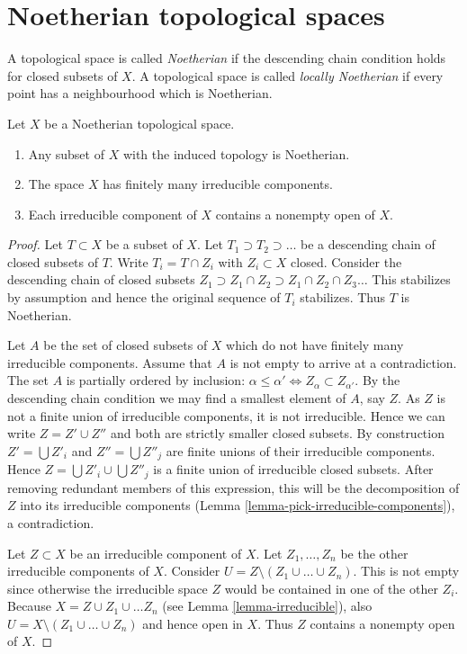 \section{Noetherian topological spaces}
\label{section-noetherian}

\begin{definition}
\label{definition-noetherian}
A topological space is called {\it Noetherian}
if the descending chain condition holds for
closed subsets of $X$. A topological space is called
{\it locally Noetherian} if every point has a neighbourhood
which is Noetherian.
\end{definition}

\begin{lemma}
\label{lemma-Noetherian}
Let $X$ be a Noetherian topological space.
\begin{enumerate}
\item Any subset of $X$ with the induced topology is Noetherian.
\item The space $X$ has finitely many irreducible components.
\item Each irreducible component of $X$ contains a nonempty open of $X$.
\end{enumerate}
\end{lemma}

\begin{proof}
Let $T \subset X$ be a subset of $X$.
Let $T_1 \supset T_2 \supset \ldots$
be a descending chain of closed subsets of $T$.
Write $T_i =  T \cap Z_i$ with $Z_i \subset X$ closed.
Consider the descending chain of closed subsets
$Z_1 \supset Z_1\cap Z_2 \supset Z_1 \cap Z_2 \cap Z_3 \ldots$
This stabilizes by assumption and hence the original sequence
of $T_i$ stabilizes. Thus $T$ is Noetherian.

\medskip\noindent
Let $A$ be the set of closed subsets of $X$ which do not
have finitely many irreducible components. Assume that
$A$ is not empty to arrive at a contradiction.
The set $A$ is partially ordered by inclusion: $\alpha \leq \alpha'
\Leftrightarrow Z_{\alpha} \subset Z_{\alpha'}$.
By the descending chain condition we may find a
smallest element of $A$, say $Z$. As $Z$ is not a finite
union of irreducible components, it is not irreducible.
Hence we can write $Z = Z' \cup Z''$ and both are strictly smaller
closed subsets. By construction $Z' = \bigcup Z'_i$ and
$Z'' = \bigcup Z''_j$ are finite unions of their irreducible
components. Hence $Z = \bigcup Z'_i \cup \bigcup Z''_j$ is
a finite union of irreducible closed subsets.
After removing redundant members of this expression,
this will be the decomposition of $Z$ into its irreducible
components (Lemma \ref{lemma-pick-irreducible-components}), a contradiction.

\medskip\noindent
Let $Z \subset X$ be an irreducible component of $X$.
Let $Z_1, \ldots, Z_n$ be the other irreducible components
of $X$. Consider $U = Z \setminus (Z_1\cup\ldots\cup Z_n)$.
This is not empty since otherwise the irreducible space
$Z$ would be contained in one of the other $Z_i$.
Because $X = Z \cup Z_1 \cup \ldots Z_n$ (see Lemma \ref{lemma-irreducible}),
also $U = X \setminus (Z_1\cup\ldots\cup Z_n)$
and hence open in $X$. Thus $Z$ contains a nonempty
open of $X$.
\end{proof}

